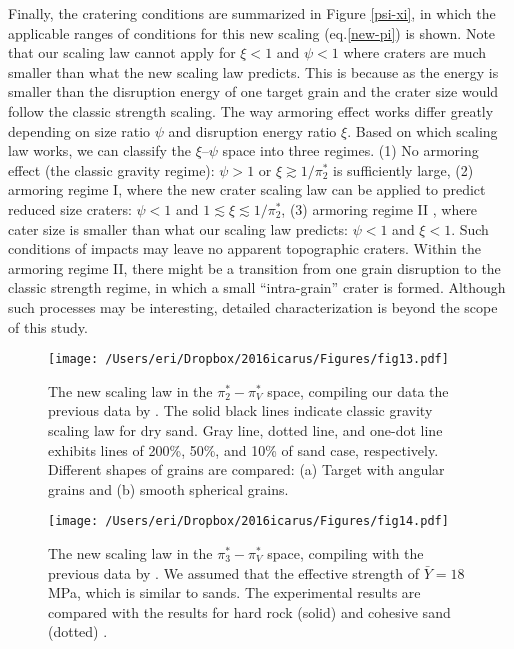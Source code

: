 \documentclass[3p,authoryear]{elsarticle}
\newcommand{\II}{I\hspace{-.1 em}I}
\begin{document}
Finally, the cratering conditions are summarized in Figure \ref{psi-xi}, in which the applicable ranges of conditions for this new scaling (eq.\eqref{new-pi}) is shown. Note that our scaling law cannot apply for $\xi<1$ and $\psi<1$ where craters are much smaller than what the new scaling law predicts.
This is because as the energy is smaller than the disruption energy of one target grain and the crater size would follow the classic strength scaling.
The way armoring effect works differ greatly depending on size ratio $\psi$ and disruption energy ratio $\xi$.
Based on which scaling law works, we can classify the $\xi$--$\psi$ space into three regimes.
(1) No armoring effect (the classic gravity regime): $\psi>1$ or $\xi \gtrsim 1/\pi_2^*$ is sufficiently large, (2) armoring regime I, where the new crater scaling law can be applied to predict reduced size craters: $\psi<1$ and $1\lesssim\xi \lesssim1/\pi_2^*$, (3) armoring regime {\II} , where cater size is smaller than what our scaling law predicts: $\psi<1$ and $\xi<1$.
Such conditions of impacts may leave no apparent topographic craters. Within the armoring regime \II, there might be a transition from one grain disruption to the classic strength regime, in which a small ``intra-grain'' crater is formed. Although such processes may be interesting, detailed characterization is  beyond the scope of this study.

\begin{figure*}[tbp]
	\centering
	\texttt{[image: /Users/eri/Dropbox/2016icarus/Figures/fig13.pdf]}
	\caption{The new scaling law in the $\pi_2^*- \pi_V^*$ space, compiling our data the previous data by \citet{schmidt1980, mizutani1983, cintala1999, yamamoto2006, guettler2012, holsapple2014}. The solid black lines indicate classic gravity scaling law for dry sand. Gray line, dotted line, and one-dot line exhibits lines of 200\%, 50\%, and 10\% of sand case, respectively. Different shapes of grains are compared: (a) Target with angular grains and (b) smooth spherical grains.}
	\label{newpi2}
	\centering
\end{figure*}
\begin{figure}[htbp]
	\centering
	\texttt{[image: /Users/eri/Dropbox/2016icarus/Figures/fig14.pdf]}
	\caption{The new scaling law in the $\pi_3^*- \pi_V^*$ space, compiling with the previous data by \citet{schmidt1980, mizutani1983, cintala1999, yamamoto2006, guettler2012, holsapple2014}. We assumed that the effective strength of $\bar{Y}=18$ MPa, which is similar to sands. The experimental results are compared with the results for hard rock (solid) and cohesive sand (dotted) \citep{schmidt1987}.}
	\label{newpi3}
	\centering
\end{figure}
\end{document}
